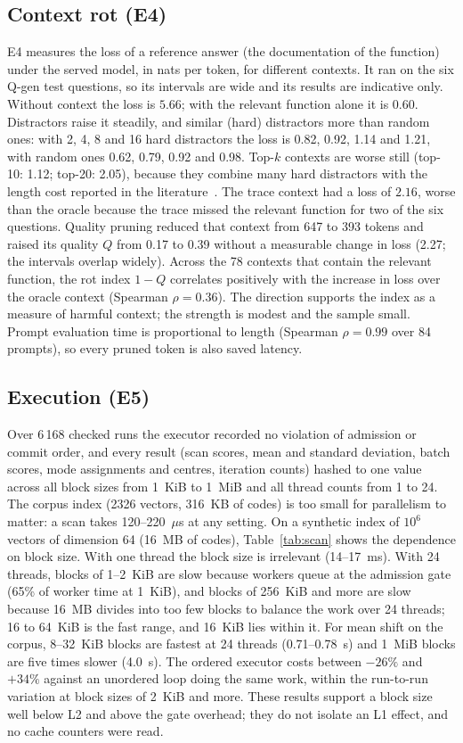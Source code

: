 \documentclass[10pt,twocolumn]{article}
\theoremstyle{definition}
\theoremstyle{remark}
\begin{document}
\subsection{Context rot (E4)}
E4 measures the loss of a reference answer (the documentation of the function) under the served model, in nats per token, for different contexts.
It ran on the six Q-gen test questions, so its intervals are wide and its results are indicative only.
Without context the loss is $5.66$; with the relevant function alone it is $0.60$.
Distractors raise it steadily, and similar (hard) distractors more than random ones: with 2, 4, 8 and 16 hard distractors the loss is 0.82, 0.92, 1.14 and 1.21, with random ones 0.62, 0.79, 0.92 and 0.98.
Top-$k$ contexts are worse still (top-10: 1.12; top-20: 2.05), because they combine many hard distractors with the length cost reported in the literature~\cite{du2025length,hong2025contextrot}.
The trace context had a loss of $2.16$, worse than the oracle because the trace missed the relevant function for two of the six questions.
Quality pruning reduced that context from 647 to 393 tokens and raised its quality $Q$ from 0.17 to 0.39 without a measurable change in loss (2.27; the intervals overlap widely).
Across the 78 contexts that contain the relevant function, the rot index $1-Q$ correlates positively with the increase in loss over the oracle context (Spearman $\rho=0.36$).
The direction supports the index as a measure of harmful context; the strength is modest and the sample small.
Prompt evaluation time is proportional to length (Spearman $\rho=0.99$ over 84 prompts), so every pruned token is also saved latency.

\subsection{Execution (E5)}
Over 6\,168 checked runs the executor recorded no violation of admission or commit order, and every result (scan scores, mean and standard deviation, batch scores, mode assignments and centres, iteration counts) hashed to one value across all block sizes from 1~KiB to 1~MiB and all thread counts from 1 to 24.
The corpus index (2326 vectors, 316~KB of codes) is too small for parallelism to matter: a scan takes 120--220~$\mu$s at any setting.
On a synthetic index of $10^6$ vectors of dimension 64 (16~MB of codes), Table~\ref{tab:scan} shows the dependence on block size.
With one thread the block size is irrelevant (14--17~ms).
With 24 threads, blocks of 1--2~KiB are slow because workers queue at the admission gate (65\% of worker time at 1~KiB), and blocks of 256~KiB and more are slow because 16~MB divides into too few blocks to balance the work over 24 threads; 16 to 64~KiB is the fast range, and 16~KiB lies within it.
For mean shift on the corpus, 8--32~KiB blocks are fastest at 24 threads (0.71--0.78~s) and 1~MiB blocks are five times slower (4.0~s).
The ordered executor costs between $-26\%$ and $+34\%$ against an unordered loop doing the same work, within the run-to-run variation at block sizes of 2~KiB and more.
These results support a block size well below L2 and above the gate overhead; they do not isolate an L1 effect, and no cache counters were read.
\end{document}
